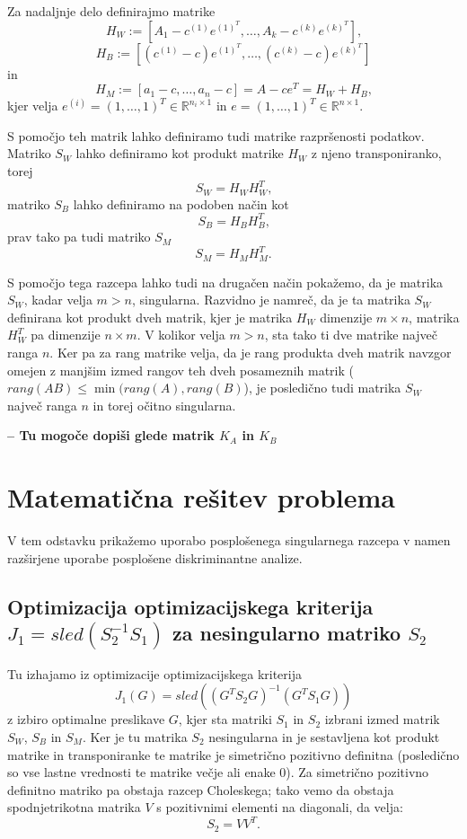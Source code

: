 \documentclass[mat1]{article}
\begin{document}
Za nadaljnje delo definirajmo matrike
$$H_W :=\left[A_1 - c^{(1)}e^{(1)^T}, \ldots, A_k - c^{(k)}e^{(k)^T}\right] \text{,}$$
$$H_B := \left[(c^{(1)} - c)e^{(1)^T}, \ldots,(c^{(k)} - c) e^{(k)^T}\right]$$
in
$$H_M := \left[a_1 - c, \ldots, a_n - c\right] = A - ce^T = H_W + H_B\text{,}$$
kjer velja
$e^{(i)} = (1,\ldots, 1) ^T \in \mathbb{R}^{ n_i \times 1 }$ in $e =  (1,\ldots, 1) ^T \in \mathbb{R}^{ n \times 1 }$.

S pomočjo teh matrik lahko definiramo tudi matrike razpršenosti podatkov. Matriko $S_W$ lahko definiramo kot produkt matrike $H_W$ z njeno transponiranko, torej
$$S_W = H_W H_W^T \text{,}$$
matriko $S_B$ lahko definiramo na podoben način kot
$$S_B = H_B H_B^T \text{,}$$
prav tako pa tudi matriko $S_M$
$$S_M = H_M H_M^T \text{.}$$

S pomočjo tega razcepa lahko tudi na drugačen način pokažemo, da je matrika $S_W$, kadar velja $m>n$, singularna. Razvidno je namreč, da je ta matrika $S_W$ definirana kot produkt dveh matrik, kjer je matrika $H_W$ dimenzije $m \times n$, matrika $H_W^T$ pa dimenzije $n \times m$. V kolikor velja $m>n$, sta tako ti dve matrike največ ranga $n$.
Ker pa za rang matrike velja, da je rang produkta dveh matrik navzgor omejen z manjšim izmed rangov teh dveh posameznih matrik ($rang(AB) \leq \min(rang(A), rang(B)$), je posledično tudi matrika $S_W$ največ ranga $n$ in torej očitno singularna.

\textbf{-- Tu mogoče dopiši glede matrik $K_A$ in $K_B$}

\section{Matematična rešitev problema}
V tem odstavku prikažemo uporabo posplošenega singularnega razcepa v namen razširjene uporabe posplošene diskriminantne analize.
 
\subsection{Optimizacija optimizacijskega kriterija $J_1 = sled(S_2^{-1} S_1)$ za nesingularno matriko $S_2$}
Tu izhajamo iz optimizacije optimizacijskega kriterija 
$$J_1(G) = sled((G^T S_2 G)^{-1} (G^T S_1 G))$$
z izbiro optimalne preslikave $G$, kjer sta matriki $S_1$ in $S_2$ izbrani izmed matrik $S_W$, $S_B$ in $S_M$. Ker je tu matrika $S_2$ nesingularna in je sestavljena kot produkt matrike in transponiranke te matrike je simetrično pozitivno definitna (posledično so vse lastne vrednosti te matrike večje ali enake 0). Za simetrično pozitivno definitno matriko pa obstaja razcep Choleskega; tako vemo da obstaja spodnjetrikotna matrika $V$ s pozitivnimi elementi na diagonali, da velja:
$$ S_2 = V V^T \text{.}
$$
\end{document}
